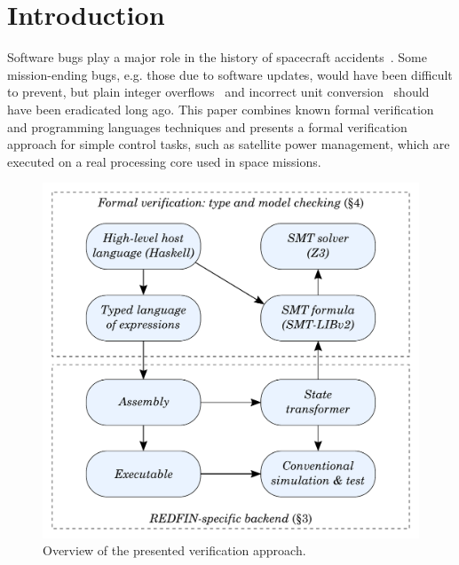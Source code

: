 \section{Introduction}\label{sec-intro}
Software bugs play a major role in the history of spacecraft
accidents~\cite{Leveson2004}. Some mission-ending bugs, e.g. those due to
software updates, would have been difficult to prevent, but plain integer
overflows~\cite{bug-rocket} and incorrect unit
conversion~\cite{NASA:1999:Mars} should have been eradicated long ago.
This paper
combines known formal verification and programming languages techniques and presents
a formal verification approach for simple control tasks, such as satellite power
management, which are executed on a real processing core used in space missions.



\begin{figure}
\centerline{\includegraphics[scale=0.42]{fig/overview.pdf}}
\caption{Overview of the presented verification approach.\label{fig-overview}}
\end{figure}

